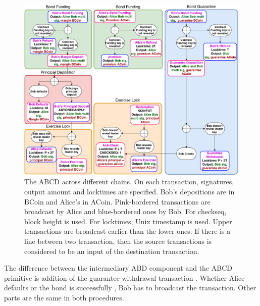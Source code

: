 \begin{figure}[]
  \centering
  \includegraphics[width=\linewidth]{figures/bond-third.pdf}
  \caption{The ABCD across different chains. On each transaction, signatures, output amount and locktimes are specified. Bob's depositions are in BCoin and Alice's in ACoin. Pink-bordered transactions are broadcast by Alice and blue-bordered ones by Bob. For checkseq, block height is used. For locktimes, Unix timestamp is used. Upper transactions are broadcast earlier than the lower ones. If there is a line between two transaction, then the source transactions is considered to be an input of the destination transaction.}
  \label{fig:cross-chain-non-collat-bond}
\end{figure}

The difference between the intermediary ABD component and the ABCD primitive is addition of the guarantee withdrawal transaction . Whether Alice defaults or the bond is successfully , Bob has to broadcast the  transaction.   Other parts are the same in both procedures.
